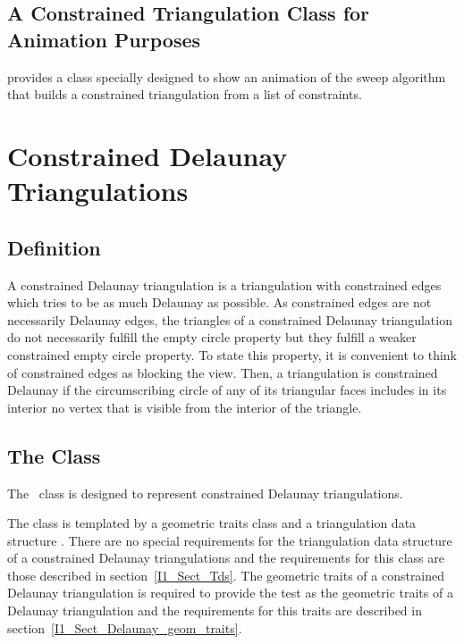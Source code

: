 \subsection{A Constrained Triangulation Class for Animation Purposes
\label{I1_Subsec_Constrained_Demo_2}}

\cgal provides 
a class  
specially designed to show an animation of the sweep algorithm 
that builds a 
constrained triangulation from a list of constraints.



\section{Constrained Delaunay Triangulations}
\label{I1_Sect_Constrained_Delaunay_Triangulations}

\subsection{Definition}
A constrained Delaunay triangulation is a triangulation with
constrained edges which tries to be as much Delaunay as possible.
As constrained edges are not necessarily Delaunay edges,
the triangles of a constrained Delaunay triangulation do not
necessarily fulfill the empty circle property
but they fulfill a weaker constrained empty circle property.
 To state this property,
it is convenient to think of  constrained
edges as blocking the view. Then, a triangulation is 
constrained Delaunay if
 the circumscribing circle
of any of its triangular faces includes in its interior 
no vertex  that is visible
from the interior of the triangle.

\subsection{The Class 
\protect {}}

The \cgal\ class
is designed to represent
constrained Delaunay triangulations.

The class is templated by a geometric traits class 
and a triangulation data structure .
There are no special requirements for the triangulation data
structure
of a constrained Delaunay triangulations and the requirements
for this class are those described
in section~\ref{I1_Sect_Tds}. The geometric traits 
of a constrained Delaunay triangulation is required
to provide the  test as the geometric traits
of a Delaunay triangulation and the requirements for this traits
are described in section~\ref{I1_Sect_Delaunay_geom_traits}. 


